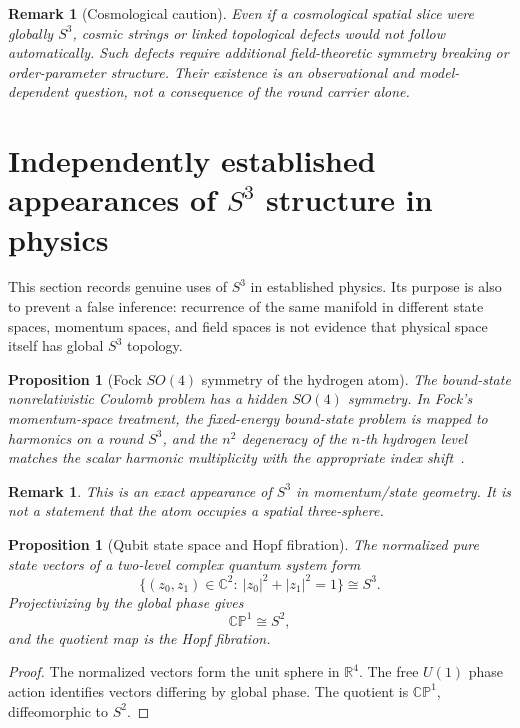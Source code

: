 \documentclass[11pt,a4paper]{article}
\newtheorem{proposition}[theorem]{Proposition}
\newtheorem{remark}[theorem]{Remark}
\begin{document}
\begin{remark}[Cosmological caution]
Even if a cosmological spatial slice were globally $S^3$, cosmic strings or linked topological defects would not follow automatically.  Such defects require additional field-theoretic symmetry breaking or order-parameter structure.  Their existence is an observational and model-dependent question, not a consequence of the round carrier alone.
\end{remark}



\section[Independently established appearances of S3 structure in physics]{Independently established appearances of $S^3$ structure in physics}
\label{sec:established-s3}

This section records genuine uses of $S^3$ in established physics.  Its purpose is also to prevent a false inference: recurrence of the same manifold in different state spaces, momentum spaces, and field spaces is not evidence that physical space itself has global $S^3$ topology.

\begin{proposition}[Fock $SO(4)$ symmetry of the hydrogen atom]
The bound-state nonrelativistic Coulomb problem has a hidden $SO(4)$ symmetry.  In Fock's momentum-space treatment, the fixed-energy bound-state problem is mapped to harmonics on a round $S^3$, and the $n^2$ degeneracy of the $n$-th hydrogen level matches the scalar harmonic multiplicity with the appropriate index shift~\cite{Fock1935}.
\end{proposition}

\begin{remark}
This is an exact appearance of $S^3$ in momentum/state geometry.  It is not a statement that the atom occupies a spatial three-sphere.
\end{remark}

\begin{proposition}[Qubit state space and Hopf fibration]
The normalized pure state vectors of a two-level complex quantum system form
\[
\{(z_0,z_1)\in\mathbb C^2:\ |z_0|^2+|z_1|^2=1\}\cong S^3.
\]
Projectivizing by the global phase gives
\[
\mathbb{CP}^1\cong S^2,
\]
and the quotient map is the Hopf fibration.
\end{proposition}
\begin{proof}
The normalized vectors form the unit sphere in $\mathbb R^4$.  The free $U(1)$ phase action identifies vectors differing by global phase.  The quotient is $\mathbb{CP}^1$, diffeomorphic to $S^2$.
\end{proof}
\end{document}
